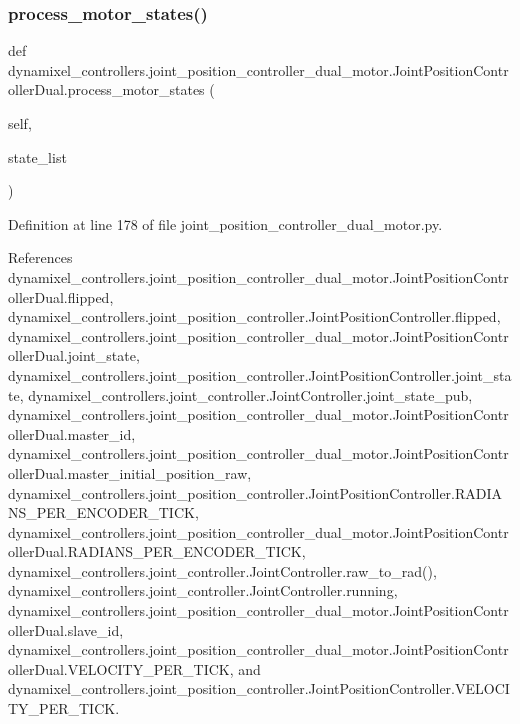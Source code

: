 \subsubsection{\texorpdfstring{process\+\_\+motor\+\_\+states()}{process\_motor\_states()}}
{\footnotesize\ttfamily def dynamixel\+\_\+controllers.\+joint\+\_\+position\+\_\+controller\+\_\+dual\+\_\+motor.\+Joint\+Position\+Controller\+Dual.\+process\+\_\+motor\+\_\+states (\begin{DoxyParamCaption}\item[{}]{self,  }\item[{}]{state\+\_\+list }\end{DoxyParamCaption})}



Definition at line 178 of file joint\+\_\+position\+\_\+controller\+\_\+dual\+\_\+motor.\+py.



References dynamixel\+\_\+controllers.\+joint\+\_\+position\+\_\+controller\+\_\+dual\+\_\+motor.\+Joint\+Position\+Controller\+Dual.\+flipped, dynamixel\+\_\+controllers.\+joint\+\_\+position\+\_\+controller.\+Joint\+Position\+Controller.\+flipped, dynamixel\+\_\+controllers.\+joint\+\_\+position\+\_\+controller\+\_\+dual\+\_\+motor.\+Joint\+Position\+Controller\+Dual.\+joint\+\_\+state, dynamixel\+\_\+controllers.\+joint\+\_\+position\+\_\+controller.\+Joint\+Position\+Controller.\+joint\+\_\+state, dynamixel\+\_\+controllers.\+joint\+\_\+controller.\+Joint\+Controller.\+joint\+\_\+state\+\_\+pub, dynamixel\+\_\+controllers.\+joint\+\_\+position\+\_\+controller\+\_\+dual\+\_\+motor.\+Joint\+Position\+Controller\+Dual.\+master\+\_\+id, dynamixel\+\_\+controllers.\+joint\+\_\+position\+\_\+controller\+\_\+dual\+\_\+motor.\+Joint\+Position\+Controller\+Dual.\+master\+\_\+initial\+\_\+position\+\_\+raw, dynamixel\+\_\+controllers.\+joint\+\_\+position\+\_\+controller.\+Joint\+Position\+Controller.\+R\+A\+D\+I\+A\+N\+S\+\_\+\+P\+E\+R\+\_\+\+E\+N\+C\+O\+D\+E\+R\+\_\+\+T\+I\+CK, dynamixel\+\_\+controllers.\+joint\+\_\+position\+\_\+controller\+\_\+dual\+\_\+motor.\+Joint\+Position\+Controller\+Dual.\+R\+A\+D\+I\+A\+N\+S\+\_\+\+P\+E\+R\+\_\+\+E\+N\+C\+O\+D\+E\+R\+\_\+\+T\+I\+CK, dynamixel\+\_\+controllers.\+joint\+\_\+controller.\+Joint\+Controller.\+raw\+\_\+to\+\_\+rad(), dynamixel\+\_\+controllers.\+joint\+\_\+controller.\+Joint\+Controller.\+running, dynamixel\+\_\+controllers.\+joint\+\_\+position\+\_\+controller\+\_\+dual\+\_\+motor.\+Joint\+Position\+Controller\+Dual.\+slave\+\_\+id, dynamixel\+\_\+controllers.\+joint\+\_\+position\+\_\+controller\+\_\+dual\+\_\+motor.\+Joint\+Position\+Controller\+Dual.\+V\+E\+L\+O\+C\+I\+T\+Y\+\_\+\+P\+E\+R\+\_\+\+T\+I\+CK, and dynamixel\+\_\+controllers.\+joint\+\_\+position\+\_\+controller.\+Joint\+Position\+Controller.\+V\+E\+L\+O\+C\+I\+T\+Y\+\_\+\+P\+E\+R\+\_\+\+T\+I\+CK.


